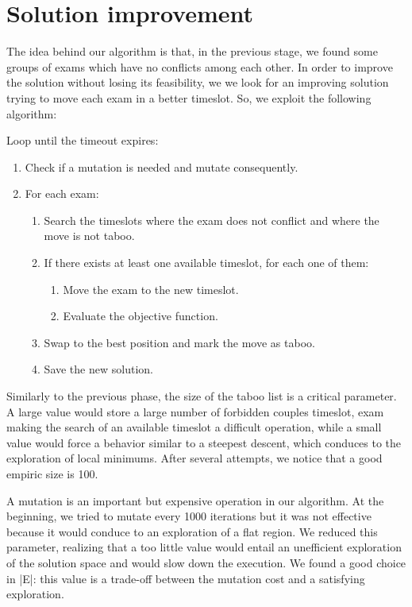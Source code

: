 \section*{Solution improvement}
The idea behind our algorithm is that, in the previous stage, we found some groups of exams which have no conflicts among each other. In order to improve the solution without losing its feasibility, we we look for an improving solution trying to move each exam in a better timeslot.
So, we exploit the following algorithm:

Loop until the timeout expires:
\begin{enumerate}
\item Check if a mutation is needed and mutate consequently.
\item For each exam:
\begin{enumerate}
\item Search the timeslots where the exam does not conflict and where the move is not taboo.
\item If there exists at least one available timeslot, for each one of them:
\begin{enumerate}
\item Move the exam to the new timeslot.
\item Evaluate the objective function.
\end{enumerate}
\item Swap to the best position and mark the move as taboo.
\item Save the new solution.
\end{enumerate}
\end{enumerate}
Similarly to the previous phase, the size of the taboo list is a critical parameter. A large value would store a large number of forbidden couples timeslot, exam making the search of an available timeslot a difficult operation, while a small value would force a behavior similar to a steepest descent, which conduces to the exploration of local minimums. After several attempts, we notice that a good empiric size is 100.

A mutation is an important but expensive operation in our algorithm. At the beginning, we tried to mutate every 1000 iterations but it was not effective because it would conduce to an exploration of a flat region. We reduced this parameter, realizing that a too little value would entail an unefficient exploration of the solution space and would slow down the execution. We found a good choice in |E|: this value is a trade-off between the mutation cost and a satisfying exploration.
